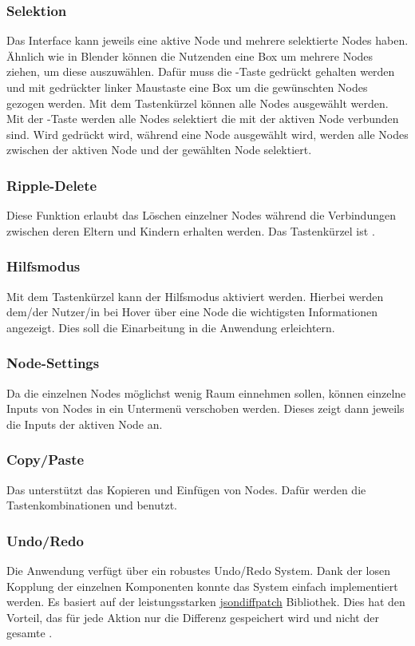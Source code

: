 \documentclass[ngerman]{article}
\begin{document}
\subsubsection{Selektion}
Das Interface kann jeweils eine aktive Node und mehrere selektierte Nodes haben.
\br
Ähnlich wie in Blender können die Nutzenden eine Box um mehrere Nodes ziehen, um diese auszuwählen. Dafür muss die -Taste gedrückt gehalten werden und mit gedrückter linker Maustaste eine Box um die gewünschten Nodes gezogen werden.
\br
Mit dem Tastenkürzel  können alle Nodes ausgewählt werden. 
\br
Mit der -Taste  werden alle Nodes selektiert die mit der aktiven Node verbunden sind.
\br
Wird  gedrückt wird, während eine Node ausgewählt wird, werden alle Nodes zwischen der aktiven Node und der gewählten Node selektiert.

\subsubsection{Ripple-Delete}
Diese Funktion erlaubt das Löschen einzelner Nodes während die Verbindungen zwischen deren Eltern und Kindern erhalten werden. Das Tastenkürzel ist .

\subsubsection{Hilfsmodus}
Mit dem Tastenkürzel  kann der Hilfsmodus aktiviert werden. Hierbei werden dem/der Nutzer/in bei Hover über eine Node die wichtigsten Informationen angezeigt. Dies soll die Einarbeitung in die Anwendung erleichtern.

\subsubsection{Node-Settings}
Da die einzelnen Nodes möglichst wenig Raum einnehmen sollen, können einzelne Inputs von Nodes in ein Untermenü verschoben werden. Dieses zeigt dann jeweils die Inputs der aktiven Node an. 

\subsubsection{Copy/Paste}
Das  unterstützt das Kopieren und Einfügen von Nodes. Dafür werden die Tastenkombinationen  und  benutzt.

\subsubsection{Undo/Redo}
Die Anwendung verfügt über ein robustes Undo/Redo System. Dank der losen Kopplung der einzelnen Komponenten konnte das System einfach implementiert werden. Es basiert auf der leistungsstarken \hyperref[https://github.com/benjamine/jsondiffpatch]{jsondiffpatch} Bibliothek. Dies hat den Vorteil,  das für jede Aktion nur die Differenz gespeichert wird und nicht der gesamte .
\end{document}
